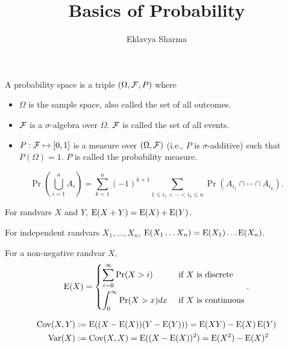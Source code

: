 \documentclass[a4paper, 12pt, fleqn]{article}
\author{Eklavya Sharma}
\date{\empty}
\title{Basics of Probability}
\DeclareMathOperator{\Cov}{Cov}
\begin{document}
\maketitle
\setlength{\parskip}{0.2em}

\begin{definition}
A probability space is a triple $(\Omega, \mathcal{F}, P)$ where
\begin{itemize}
\item $\Omega$ is the sample space, also called the set of all outcomes.
\item $\mathcal{F}$ is a $\sigma$-algebra over $\Omega$. $\mathcal{F}$ is called the set of all events.
\item $P: \mathcal{F} \mapsto [0, 1]$ is a measure over $(\Omega, \mathcal{F})$
    (i.e., $P$ is $\sigma$-additive) such that $P(\Omega) = 1$.
    $P$ is called the probability measure.
\end{itemize}
\end{definition}

\begin{theorem}
\[ \Pr\left(\bigcup_{i=1}^n A_i\right)
= \sum_{k=1}^n (-1)^{k+1} \sum_{1 \le i_1 < \cdots < i_k \le n} \Pr(A_{i_1} \cap \cdots \cap A_{i_k}). \]
\end{theorem}

\begin{theorem}
For randvars $X$ and $Y$, $\operatorname*{E}(X + Y) = \operatorname*{E}(X) + \operatorname*{E}(Y)$.
\end{theorem}

\begin{theorem}
For independent randvars $X_1, \ldots, X_n$, $\operatorname*{E}(X_1 \ldots X_n) = \operatorname*{E}(X_1) \ldots \operatorname*{E}(X_n)$.
\end{theorem}

\begin{theorem}
For a non-negative randvar $X$,
\[ \operatorname*{E}(X) = \begin{cases} \displaystyle \sum_{i=0}^{\infty} \Pr(X > i) & \textrm{ if $X$ is discrete}
\\[1.2em] \displaystyle \int_0^{\infty} \Pr(X > x) dx & \textrm{ if $X$ is continuous} \end{cases}. \]
\end{theorem}

\begin{definition}
\begin{align*}
\Cov(X, Y) &\defeq \E((X-\E(X))(Y-\E(Y))) = \E(XY) - \E(X)\E(Y)
\\ \Var(X) &\defeq \Cov(X, X) = \E((X-\E(X))^2) = \E(X^2) - \E(X)^2
\end{align*}
\end{definition}
\end{document}
